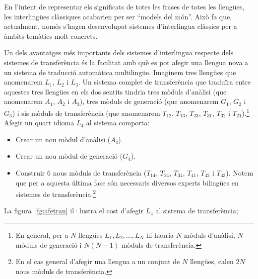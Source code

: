 En l'intent de representar els significats de totes les frases de
totes les llengües, les interlingües clàssiques acabarien per ser
``models del món''. Això fa que, actualment, només s'hagen
desenvolupat sistemes d'interlingua clàssics per a àmbits temàtics
molt concrets.

Un dels avantatges més importants dels sistemes d'interlingua respecte
dels sistemes de transferència és la facilitat amb què es pot afegir
una llengua nova a un sistema de traducció automàtica multilingüe.
Imaginem tres llengües que anomenarem $L_1$, $L_2$ i $L_3$. Un sistema
complet de transferència que traduïra entre aquestes tres llengües en
els dos sentits tindria tres mòduls d'anàlisi (que anomenarem $A_1$,
$A_2$ i $A_3$), tres mòduls de generació (que anomenarem $G_1$, $G_2$
i $G_3$) i sis mòduls de transferència (que anomenarem $T_{12}$,
$T_{13}$, $T_{23}$, $T_{31}$, $T_{32}$ i $T_{21}$).\footnote{En
  general, per a $N$ llengües $L_1, L_2, \ldots, L_N$ hi hauria $N$
  mòduls d'anàlisi, $N$ mòduls de generació i $N(N-1)$ mòduls de
  transferència.} Afegir un quart idioma $L_4$ al sistema comporta:
\begin{itemize}
\item Crear un nou mòdul d'anàlisi ($A_4$).
\item Crear un nou mòdul de generació ($G_4$).
\item Construir 6 nous mòduls de transferència ($T_{14}$, $T_{24}$,
$T_{34}$, $T_{41}$, $T_{42}$ i $T_{43}$). Notem que per a aquesta última
fase són necessaris diversos experts bilingües en sistemes de
transferència.\footnote{En el cas general d'afegir una llengua
a un conjunt de $N$ llengües, calen $2N$ nous mòduls de transferència.}
\end{itemize}
La figura~\ref{fg:afetran}
il·lustra el cost d'afegir $L_4$ al sistema de transferència;
